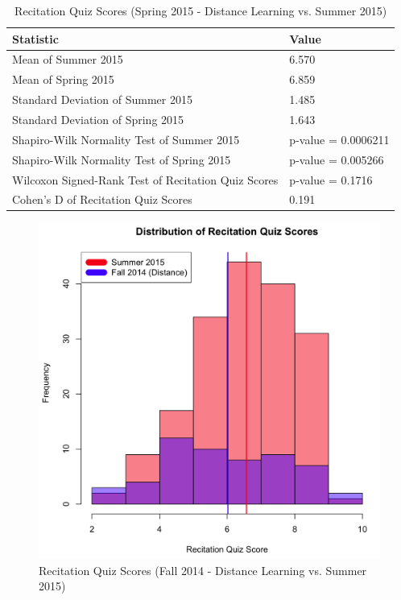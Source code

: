 \pagebreak\clearpage

\begin{small}
\begin{table}
  \centering
  \begin{tabular}{|l|l|}
    \hline
    \textbf{Statistic} & \textbf{Value} \\
	\hline
	Mean of Summer 2015 & 6.570 \\
	\hline
	Mean of Spring 2015 & 6.859 \\
	\hline
	Standard Deviation of Summer 2015 & 1.485 \\
	\hline
	Standard Deviation of Spring 2015 & 1.643 \\
	\hline
	Shapiro-Wilk Normality Test of Summer 2015 & p-value = 0.0006211 \\
	\hline
	Shapiro-Wilk Normality Test of Spring 2015 & p-value = 0.005266 \\
	\hline
	Wilcoxon Signed-Rank Test of Recitation Quiz Scores & p-value = 0.1716 \\
	\hline
	Cohen's D of Recitation Quiz Scores & 0.191 \\
	\hline
  \end{tabular}
	\caption{Recitation Quiz Scores (Spring 2015 - Distance Learning vs. Summer 2015)}
  \label{tab:rqSp15dSu15}
\end{table}
\end{small}

\pagebreak\clearpage

\begin{figure}
	\centering
	\includegraphics[width=5in]{img/chapter4/rq_su15_vs_f14d}
	\caption{Recitation Quiz Scores (Fall 2014 - Distance Learning vs. Summer 2015)}
  \label{fig:rqf14dSu15}
\end{figure}

